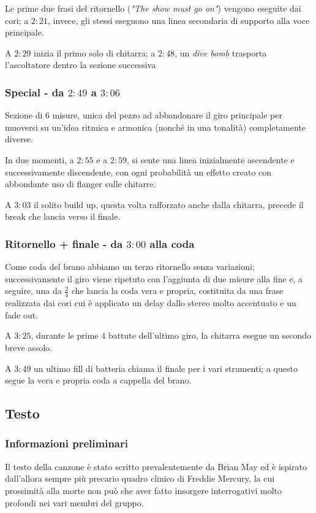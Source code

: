 \documentclass[12pt]{article}
\begin{document}
Le prime due frasi del ritornello (\emph{"The show must go on"}) vengono eseguite dai cori; a \(2:21\), invece, gli stessi eseguono una linea secondaria di supporto alla voce principale.

A \(2:29\) inizia il primo solo di chitarra; a \(2:48\), un \emph{dive bomb} trasporta l'ascoltatore dentro la sezione successiva

\subsubsection*{Special - da \(2:49\) a \(3:06\)}
Sezione di \(6\) misure, unica del pezzo ad abbandonare il giro principale per muoversi su un'idea ritmica e armonica (nonché in una tonalità) completamente diverse.

In due momenti, a \(2:55\) e a \(2:59\), si sente una linea inizialmente ascendente e successivamente discendente, con ogni probabilità un effetto creato con abbondante uso di flanger sulle chitarre.

A \(3:03\) il solito build up, questa volta rafforzato anche dalla chitarra, precede il break che lancia verso il finale.

\subsubsection*{Ritornello + finale - da \(3:00\) alla coda}
Come coda del brano abbiamo un terzo ritornello senza variazioni; successivamente il giro viene ripetuto con l'aggiunta di due misure alla fine e, a seguire, una da \(\frac{2}{4}\) che lancia la coda vera e propria, costituita da una frase realizzata dai cori cui è applicato un delay dallo stereo molto accentuato e un fade out.

A \(3:25\), durante le prime \(4\) battute dell'ultimo giro, la chitarra esegue un secondo breve assolo.

A \(3:49\) un ultimo fill di batteria chiama il finale per i vari strumenti; a questo segue la vera e propria coda a cappella del brano.

\subsection{Testo}

\subsubsection{Informazioni preliminari}
Il testo della canzone è stato scritto prevalentemente da Brian May ed è ispirato dall'allora sempre più precario quadro clinico di Freddie Mercury, la cui prossimità alla morte non può che aver fatto insorgere interrogativi molto profondi nei vari membri del gruppo.
\end{document}
